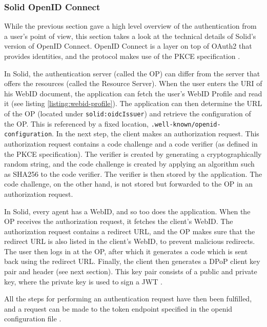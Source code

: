 \subsubsection{Solid OpenID Connect}
\label{sec:solid-oidc}
While the previous section gave a high level overview of the authentication from a user's point of view, this section takes a look at the technical details of Solid's version of OpenID Connect. OpenID Connect is a layer on top of OAuth2 that provides identities, and the protocol makes use of the \acrshort{PKCE} specification \citep{pkce}.

In Solid, the authentication server (called the \gls{OP}) can differ from the server that offers the resources (called the Resource Server).  When the user enters the URI of his WebID document, the application can fetch the user's WebID Profile and read it (see listing \ref{listing:webid-profile}). The application can then determine the URL of the \acrfull{OP} (located under \texttt{solid:oidcIssuer}) and retrieve the configuration of the \gls{OP}. This is referenced by a fixed location, \texttt{.well-known/openid-configuration}. 
In the next step, the client makes an authorization request. This authorization request contains a code challenge and a code verifier (as defined in the \acrshort{PKCE} specification). The verifier is created by generating a cryptographically random string, and the code challenge is created by applying an algorithm such as SHA256 to the code verifier. The verifier is then stored by the application. The code challenge, on the other hand, is not stored but forwarded to the \gls{OP} in an authorization request. 

\noindent In Solid, every agent has a WebID, and so too does the application. When the \gls{OP} receives the authorization request, it fetches the client's WebID. The authorization request contains a redirect URL, and the \gls{OP} makes sure that the redirect URL is also listed in the client's WebID, to prevent malicious redirects. The user then logs in at the \gls{OP}, after which it generates a code which is sent back using the redirect URL. Finally, the client then generates a \gls{DPoP} client key pair and header (see next section). This key pair consists of a public and private key, where the private key is used to sign a \gls{JWT} \citep{JWT}.

All the steps for performing an authentication request have then been fulfilled, and a request can be made to the token endpoint specified in the openid configuration file \citep{solid-oidc-primer}. 

